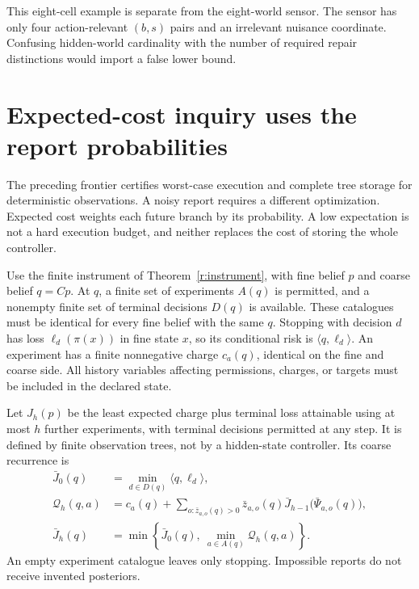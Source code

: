 This eight-cell example is separate from the eight-world sensor. The sensor has only four action-relevant $(b,s)$ pairs and an irrelevant nuisance coordinate. Confusing hidden-world cardinality with the number of required repair distinctions would import a false lower bound.


\section{Expected-cost inquiry uses the report probabilities}
The preceding frontier certifies worst-case execution and complete tree storage for deterministic observations. A noisy report requires a different optimization. Expected cost weights each future branch by its probability. A low expectation is not a hard execution budget, and neither replaces the cost of storing the whole controller.

Use the finite instrument of Theorem~\ref{r:instrument}, with fine belief $p$ and coarse belief $q=Cp$. At $q$, a finite set of experiments $A(q)$ is permitted, and a nonempty finite set of terminal decisions $D(q)$ is available. These catalogues must be identical for every fine belief with the same $q$. Stopping with decision $d$ has loss $\ell_d(\pi(x))$ in fine state $x$, so its conditional risk is $\langle q,\ell_d\rangle$. An experiment has a finite nonnegative charge $c_a(q)$, identical on the fine and coarse side. All history variables affecting permissions, charges, or targets must be included in the declared state.

Let $J_h(p)$ be the least expected charge plus terminal loss attainable using at most $h$ further experiments, with terminal decisions permitted at any step. It is defined by finite observation trees, not by a hidden-state controller. Its coarse recurrence is
\begin{align*}
 \bar J_0(q)&=\min_{d\in D(q)}\langle q,\ell_d\rangle,\\
 \mathcal Q_h(q,a)&=c_a(q)+\sum_{o:\bar z_{a,o}(q)>0}
       \bar z_{a,o}(q)\bar J_{h-1}\bigl(\bar\Psi_{a,o}(q)\bigr),\\
 \bar J_h(q)&=\min\left\{\bar J_0(q),\ \min_{a\in A(q)}\mathcal Q_h(q,a)\right\}.
\end{align*}
An empty experiment catalogue leaves only stopping. Impossible reports do not receive invented posteriors.

